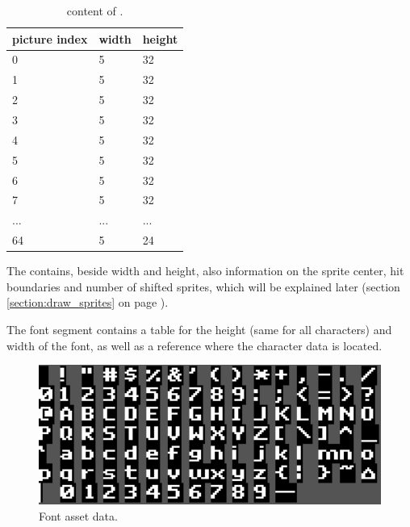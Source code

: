 \documentclass[book.tex]{subfiles}
\begin{document}
  \begin{table}[H]
  \begin{tabularx}{0.8\textwidth}[c]{XXX}
  \hline
  \textbf{picture index} & \textbf{width} & \textbf{height}   \\ \hline
  0             & 5          & 32    \\
  1             & 5          & 32    \\
  2             & 5          & 32    \\
  3             & 5          & 32    \\
  4             & 5          & 32    \\
  5             & 5          & 32    \\
  6             & 5          & 32    \\
  7             & 5          & 32    \\
  ...             & ...          & ...    \\
  64             & 5          & 24    \\
  \end{tabularx}
  \caption{content of .}
  \end{table}



The  contains, beside width and height, also information on the sprite center, hit boundaries and number of shifted sprites, which will be explained later (section \ref{section:draw_sprites} on page \pageref{section:draw_sprites}). \\
\par


The font segment contains a table for the height (same for all characters) and width of the font, as well as a reference where the character data is located.\\
\par
\begin{minipage}{\textwidth}
 \par
 \end{minipage}
\begin{figure}[H] 
  \centering 
  \includegraphics[width=1.0\textwidth, frame]{screenshots_300dpi/font.png}
  \caption{Font asset data.}
  \label{fig:font_assets}
\end{figure} 
\end{document}
